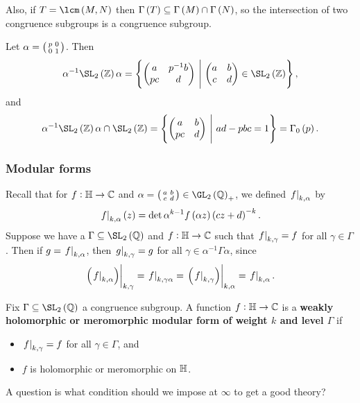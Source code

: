 \begin{note*}
Also, if $ T = \lcm\br{M, N} $ then $ \Gamma\br{T} \subseteq \Gamma\br{M} \cap \Gamma\br{N} $, so the intersection of two congruence subgroups is a congruence subgroup.
\end{note*}

\begin{example*}
Let $ \alpha = \begin{psmallmatrix} p & 0 \\ 0 & 1 \end{psmallmatrix} $. Then
$$ \alpha^{-1}\SL_2\br{\ZZ}\alpha = \cbr{\twobytwo{a}{p^{-1}b}{pc}{d} \st \twobytwo{a}{b}{c}{d} \in \SL_2\br{\ZZ}}, $$
and
$$ \alpha^{-1}\SL_2\br{\ZZ}\alpha \cap \SL_2\br{\ZZ} = \cbr{\twobytwo{a}{b}{pc}{d} \st ad - pbc = 1} = \Gamma_0\br{p}. $$
\end{example*}

\pagebreak

\subsubsection{Modular forms}

Recall that for $ f : \mathbb{H} \to \mathbb{C} $ and $ \alpha = \twobytwosmall{a}{b}{c}{d} \in \GL_2\br{\QQ}_+ $, we defined $ \left. f \right|_{k, \alpha} $ by
$$ \eval{f}_{k, \alpha}\br{z} = \det \alpha^{k - 1}f\br{\alpha z}\br{cz + d}^{-k}. $$
Suppose we have a $ \Gamma \subseteq \SL_2\br{\QQ} $ and $ f : \mathbb{H} \to \mathbb{C} $ such that $ \left. f \right|_{k, \gamma} = f $ for all $ \gamma \in \Gamma $. Then if $ g = \left. f \right|_{k, \alpha} $, then $ \left. g \right|_{k, \gamma} = g $ for all $ \gamma \in \alpha^{-1}\Gamma\alpha $, since
$$ \eval{\br{\eval{f}_{k, \alpha}}}_{k, \gamma} = \eval{f}_{k, \gamma\alpha} = \eval{\br{\eval{f}_{k, \gamma}}}_{k, \alpha} = \eval{f}_{k, \alpha}. $$

\begin{definition}
Fix $ \Gamma \subseteq \SL_2\br{\QQ} $ a congruence subgroup. A function $ f : \mathbb{H} \to \mathbb{C} $ is a \textbf{weakly holomorphic or meromorphic modular form of weight $ k $ and level $ \Gamma $} if
\begin{itemize}
\item $ \left. f \right|_{k, \gamma} = f $ for all $ \gamma \in \Gamma $, and
\item $ f $ is holomorphic or meromorphic on $ \mathbb{H} $.
\end{itemize}
\end{definition}

A question is what condition should we impose at $ \infty $ to get a good theory?

